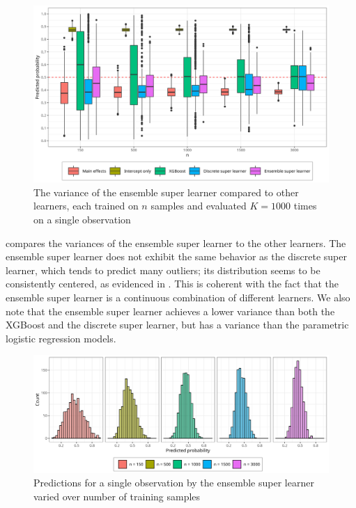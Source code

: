 \documentclass[./main.tex]{subfiles}
\begin{document}
\begin{figure}[H]
    \centering
    \includegraphics[width=\textwidth]{figures/learner_vars_w_esl_1000.png}
    \caption{The variance of the ensemble super learner compared to other learners, each trained on $n$ samples and evaluated $ K = 1000 $ times on a single observation}
    \label{fig:learner_vars_w_esl_1000}
\end{figure}
 compares the variances of the ensemble super learner to the other learners. The ensemble super learner does not exhibit the same behavior as the discrete super learner, which tends to predict many outliers; its distribution seems to be consistently centered, as evidenced in . This is coherent with the fact that the ensemble super learner is a continuous combination of different learners. We also note that the ensemble super learner achieves a lower variance than both the XGBoost and the discrete super learner, but has a variance than the parametric logistic regression models. 
\begin{figure}[H]
    \centering
    \includegraphics[width=\textwidth]{figures/hist_esl_dist.png}
    \caption{Predictions for a single observation by the ensemble super learner varied over number of training samples}
    \label{fig:hist_esl_dist}
\end{figure}
\end{document}
